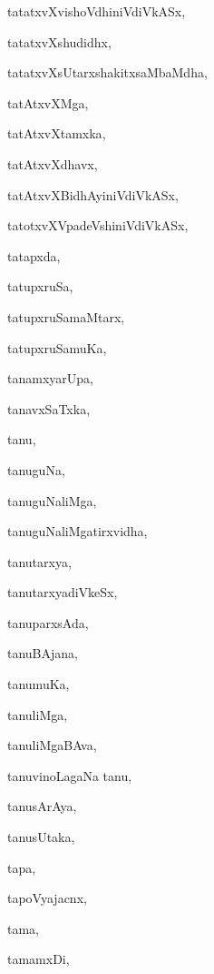 \begin{multicols}{2}
{tatatxvXvishoVdhiniVdiVkASx}, \pageref{tatatxvXvishoVdhiniVdiVkASx}

{tatatxvXshudidhx}, \pageref{tatatxvXshudidhx}

{tatatxvXsUtarxshakitxsaMbaMdha}, \pageref{tatatxvXsUtarxshakitxsaMbaMdha}

{tatAtxvXMga}, \pageref{tatAtxvXMga}

{tatAtxvXtamxka}, \pageref{tatAtxvXtamxka}

{tatAtxvXdhavx}, \pageref{tatAtxvXdhavx}

{tatAtxvXBidhAyiniVdiVkASx}, \pageref{tatAtxvXBidhAyiniVdiVkASx}

{tatotxvXVpadeVshiniVdiVkASx}, \pageref{tatotxvXVpadeVshiniVdiVkASx}

{tatapxda}, \pageref{tatapxda}

{tatupxruSa}, \pageref{tatupxruSa}

{tatupxruSamaMtarx}, \pageref{tatupxruSamaMtarx}

{tatupxruSamuKa}, \pageref{tatupxruSamuKa}

{tanamxyarUpa}, \pageref{tanamxyarUpa}

{tanavxSaTxka}, \pageref{tanavxSaTxka}

{tanu}, \pageref{tanu}

{tanuguNa}, \pageref{tanuguNa}

{tanuguNaliMga}, \pageref{tanuguNaliMga}

{tanuguNaliMgatirxvidha}, \pageref{tanuguNaliMgatirxvidha}

{tanutarxya}, \pageref{tanutarxya}

{tanutarxyadiVkeSx}, \pageref{tanutarxyadiVkeSx}

{tanuparxsAda}, \pageref{tanuparxsAda}

{tanuBAjana}, \pageref{tanuBAjana}

{tanumuKa}, \pageref{tanumuKa}

{tanuliMga}, \pageref{tanuliMga}

{tanuliMgaBAva}, \pageref{tanuliMgaBAva}

{tanuvinoLagaNa tanu}, \pageref{tanuvinoLagaNa tanu}

{tanusArAya}, \pageref{tanusArAya}

{tanusUtaka}, \pageref{tanusUtaka}

{tapa}, \pageref{tapa}

{tapoVyajacnx}, \pageref{tapoVyajacnx}

{tama}, \pageref{tama}

{tamamxDi}, \pageref{tamamxDi}


\end{multicols}

